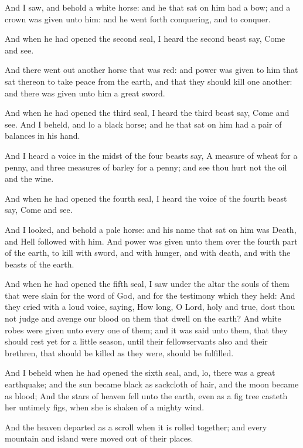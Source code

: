 \verse And I saw, and behold a white horse: and he that sat on him had a bow; and a crown was given unto him: and he went forth conquering, and to conquer.

\verse And when he had opened the second seal, I heard the second beast say, Come and see.

\verse And there went out another horse that was red: and power was given to him that sat thereon to take peace from the earth, and that they should kill one another: and there was given unto him a great sword.

\verse And when he had opened the third seal, I heard the third beast say, Come and see. And I beheld, and lo a black horse; and he that sat on him had a pair of balances in his hand.

\verse And I heard a voice in the midst of the four beasts say, A measure of wheat for a penny, and three measures of barley for a penny; and see thou hurt not the oil and the wine.

\verse And when he had opened the fourth seal, I heard the voice of the fourth beast say, Come and see.

\verse And I looked, and behold a pale horse: and his name that sat on him was Death, and Hell followed with him. And power was given unto them over the fourth part of the earth, to kill with sword, and with hunger, and with death, and with the beasts of the earth.

\verse And when he had opened the fifth seal, I saw under the altar the souls of them that were slain for the word of God, and for the testimony which they held: \verse And they cried with a loud voice, saying, How long, O Lord, holy and true, dost thou not judge and avenge our blood on them that dwell on the earth?  \verse And white robes were given unto every one of them; and it was said unto them, that they should rest yet for a little season, until their fellowservants also and their brethren, that should be killed as they were, should be fulfilled.

\verse And I beheld when he had opened the sixth seal, and, lo, there was a great earthquake; and the sun became black as sackcloth of hair, and the moon became as blood; \verse And the stars of heaven fell unto the earth, even as a fig tree casteth her untimely figs, when she is shaken of a mighty wind.

\verse And the heaven departed as a scroll when it is rolled together; and every mountain and island were moved out of their places.

